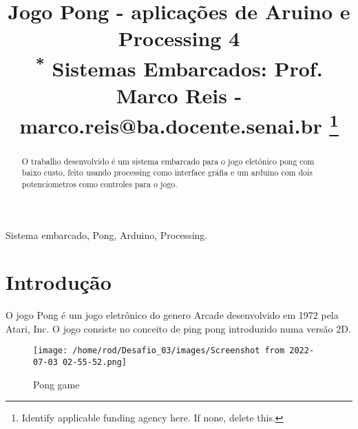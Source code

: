 \documentclass[conference]{IEEEtran}
\begin{document}
\title{Jogo Pong - aplicações de Aruino e Processing 4\\
{\footnotesize \textsuperscript{*} Sistemas Embarcados: Prof. Marco Reis - marco.reis@ba.docente.senai.br}
\thanks{Identify applicable funding agency here. If none, delete this.}
}



\author{
\and
{}

}


\maketitle

\begin{abstract}
 O trabalho desenvolvido é um sistema embarcado para o jogo eletônico pong com baixo custo, feito usando
 processing como interface gráfia e um arduino com dois potenciometros como 
 controles para o jogo.
\end{abstract}

\begin{IEEEkeywords}
Sistema embarcado, Pong, Arduino, Processing.
\end{IEEEkeywords}

\section{Introdução}

O jogo Pong é um jogo eletrônico do genero Arcade desenvolvido
em 1972 pela Atari, Inc. O jogo consiste no conceito de ping pong
introduzido numa versão 2D. 

\begin{figure}[htbp]
    \centerline{\texttt{[image: /home/rod/Desafio\_03/images/Screenshot from 2022-07-03 02-55-52.png]}}
    \caption{Pong game}
    \label{fig}
    \end{figure}
\end{document}

